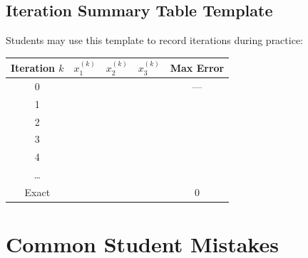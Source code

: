\documentclass[12pt,a4paper]{article}
\begin{document}
\subsection*{Iteration Summary Table Template}

Students may use this template to record iterations during practice:

\begin{center}
\begin{tabular}{@{}ccccc@{}}
\toprule
Iteration \(k\) & \(x_1^{(k)}\) & \(x_2^{(k)}\) & \(x_3^{(k)}\) & Max Error \\
\midrule
0 & & & & --- \\
1 & & & & \\
2 & & & & \\
3 & & & & \\
4 & & & & \\
\ldots & & & & \\
Exact & & & & 0 \\
\bottomrule
\end{tabular}
\end{center}

\section{Common Student Mistakes}
\end{document}

